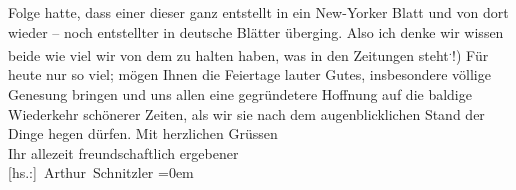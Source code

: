 \begin{ledgroupsized}[t]{13cm}
                    Folge hatte, dass einer dieser \label{K_L02224_4v}\label{K_L02224_4h} ganz entstellt in ein New-Yorker Blatt und von dort
                    wieder \introOben{}–\introOben{} noch entstellter in deutsche Blätter
                    überging. Also ich denke wir wissen beide wie viel wir von dem zu halten haben,
                    was in den Zeitungen steht\substVorne{}\textsuperscript{.}\substDazwischen{}!\substHinten{}\introOben{})\introOben{}\pend
           \pstart
           Für heute nur so viel; mögen Ihnen die Feiertage lauter Gutes, insbesondere
                    völlige Genesung bringen und uns allen eine gegründetere Hoffnung auf die
                    baldige Wiederkehr schönerer Zeiten, als wir sie nach dem augenblicklichen Stand
                    der Dinge hegen dürfen.\pend
           \pstart
           Mit herzlichen Grüssen{\\[\baselineskip]}Ihr allezeit freundschaftlich ergebener{\\[\baselineskip]}\spacefill\mbox{{[}hs.:{]} Arthur Schnitzler}\pend
           \leftskip=0em{}
         
         \endnumbering{}\end{ledgroupsized}  \newcommand{\dateiname}{L02224}\newcommand{\titel}{Arthur Schnitzler an Georg Brandes, 22. 12. 1915}\newcommand{\editorInnen}{Martin Anton Müller und Gerd-Hermann Susen}
      